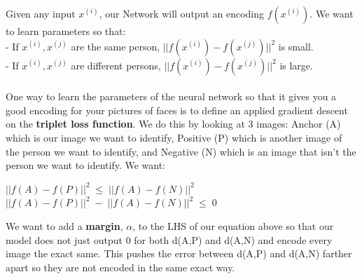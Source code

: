 \documentclass[11pt, a4paper]{article}
\begin{document}
\begin{spacing}{1.1}
\begin{center}
	\end{center}
	Given any input $x^{(i)}$, our Network will output an encoding $f(x^{(i)})$. We want to learn parameters so that:\vspace*{1mm}\\
	- If $x^{(i)}, x^{(j)}$ are the same person, $||f(x^{(i)}) - f(x^{(j)})||^2$ is small. \vspace*{1mm}\\
	- If $x^{(i)}, x^{(j)}$ are different persons, $||f(x^{(i)}) - f(x^{(j)})||^2$ is large. \\~\\	
	One way to learn the parameters of the neural network so that it gives you a good encoding for your pictures of faces is to define an applied gradient descent on the \textbf{triplet loss function}. We do this by looking at 3 images: Anchor (A) which is our image we want to identify, Positive (P) which is another image of the person we want to identify, and Negative (N) which is an image that isn't the person we want to identify. We want: 
	\begin{center}
	$ ||f(A) - f(P)||^2 \; \leq \; ||f(A) - f(N)||^2 $ \vspace*{1mm}\\
	$ ||f(A) - f(P)||^2 \; - \; ||f(A) - f(N)||^2 \; \leq\; 0 $
	\end{center}
	We want to add a \textbf{margin}, $\alpha$, to the LHS of our equation above so that our model does not just output 0 for both d(A,P) and d(A,N) and encode every image the exact same. This pushes the error between d(A,P) and d(A,N) farther apart so they are not encoded in the same exact way. \newpage


\end{spacing}
\end{document}
